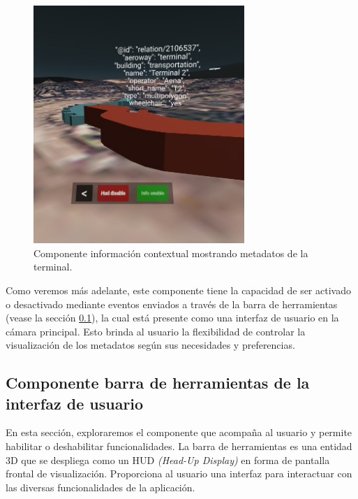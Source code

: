 \documentclass[a4paper, 11pt]{book}
\begin{document}
\begin{figure}[h]
  \centering
  \includegraphics[width=8cm, keepaspectratio]{img/tooltip.jpg}
  \caption{Componente información contextual mostrando metadatos de la terminal.}
  \label{fig:tooltip}
\end{figure}
Como veremos más adelante, este componente tiene la capacidad de ser activado o desactivado mediante eventos enviados a través de la barra de herramientas (vease la sección \ref{subsec:toolbar3d}), la cual está presente como una interfaz de usuario en la cámara principal. Esto brinda al usuario la flexibilidad de controlar la visualización de los metadatos según sus necesidades y preferencias.

\subsection{Componente barra de herramientas de la interfaz de usuario}
\label{subsec:toolbar3d}
En esta sección, exploraremos el componente que acompaña al usuario y permite habilitar o deshabilitar funcionalidades. La barra de herramientas es una entidad 3D que se despliega como un \textsc{HUD} \emph{(Head-Up Display)} en forma de pantalla frontal de visualización. Proporciona al usuario una interfaz para interactuar con las diversas funcionalidades de la aplicación.
\end{document}
